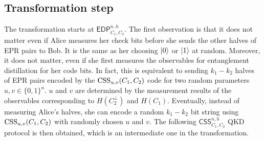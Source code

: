 \subsection{Transformation step}
The transformation starts at $\mathsf{EDP}^{n,h}_{C_1,C_2}$.
The first observation is that it does not matter even if
Alice measures her check bits before she sends the other halves
of EPR pairs to Bob. It is the same as her choosing $|0\rangle$ or
$|1\rangle$ at random. Moreover, it does not matter,
even if she first measures the observables
for entanglement distillation for her code bits.
In fact, this is equivalent to sending $k_1 - k_2$ halves
of EPR pairs encoded by the $\mathrm{CSS}_{u,v}(C_1,C_2)$ code for
two random parameters $u,v \in \{0,1\}^n$. 
$u$ and $v$ are determined by the measurement results of the observables 
corresponding to $H(C_2^\perp)$ and $H(C_1)$.
Eventually, instead of measuring Alice's halves, she
can encode a random $k_1 - k_2$ bit string using $\mathrm{CSS}_{u,v}(C_1,C_2)$
with randomly chosen $u$ and $v$.
The following $\mathsf{CSS}^{n,h}_{C_1,C_2}$ QKD protocol is then
obtained, which is an intermediate one in the transformation.

